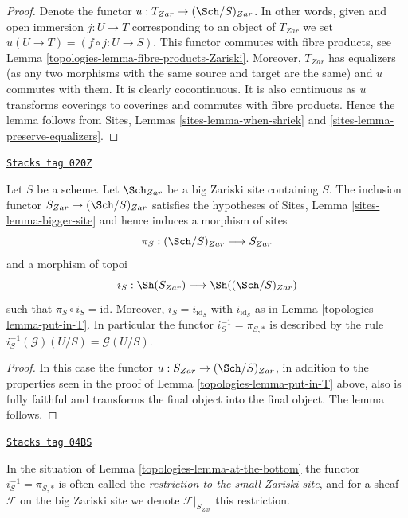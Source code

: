 \begin{proof}

Denote the functor $u : T_{Zar} \to (\Sch/S)_{Zar}$.
In other words, given and open immersion $j : U \to T$ corresponding
to an object of $T_{Zar}$ we set $u(U \to T) = (f \circ j : U \to S)$.
This functor commutes with fibre products, see
Lemma \ref{topologies-lemma-fibre-products-Zariski}.
Moreover, $T_{Zar}$ has equalizers (as any two morphisms with the same
source and target are the same) and $u$ commutes with them.
It is clearly cocontinuous.
It is also continuous as $u$ transforms coverings to coverings and
commutes with fibre products. Hence the lemma follows from
Sites, Lemmas \ref{sites-lemma-when-shriek}
and \ref{sites-lemma-preserve-equalizers}.
\end{proof}

\begin{lemma}
\label{topologies-lemma-at-the-bottom}
\href{https://stacks.math.columbia.edu/tag/020Z}{\texttt{Stacks tag 020Z}}

Let $S$ be a scheme. Let $\Sch_{Zar}$ be a big Zariski
site containing $S$.
The inclusion functor $S_{Zar} \to (\Sch/S)_{Zar}$
satisfies the hypotheses of Sites, Lemma \ref{sites-lemma-bigger-site}
and hence induces a morphism of sites
$$
\pi_S : (\Sch/S)_{Zar} \longrightarrow S_{Zar}
$$
and a morphism of topoi
$$
i_S : \Sh(S_{Zar}) \longrightarrow \Sh((\Sch/S)_{Zar})
$$
such that $\pi_S \circ i_S = \text{id}$. Moreover, $i_S = i_{\text{id}_S}$
with $i_{\text{id}_S}$ as in Lemma \ref{topologies-lemma-put-in-T}. In particular the
functor $i_S^{-1} = \pi_{S, *}$ is described by the rule
$i_S^{-1}(\mathcal{G})(U/S) = \mathcal{G}(U/S)$.
\end{lemma}

\begin{proof}

In this case the functor $u : S_{Zar} \to (\Sch/S)_{Zar}$,
in addition to the properties seen in the proof of
Lemma \ref{topologies-lemma-put-in-T} above, also is fully faithful
and transforms the final object into the final object.
The lemma follows.
\end{proof}

\begin{definition}
\label{topologies-definition-restriction-small-zariski}
\href{https://stacks.math.columbia.edu/tag/04BS}{\texttt{Stacks tag 04BS}}

In the situation of
Lemma \ref{topologies-lemma-at-the-bottom}
the functor $i_S^{-1} = \pi_{S, *}$ is often
called the {\it restriction to the small Zariski site}, and for a sheaf
$\mathcal{F}$ on the big Zariski site we denote $\mathcal{F}|_{S_{Zar}}$
this restriction.
\end{definition}

